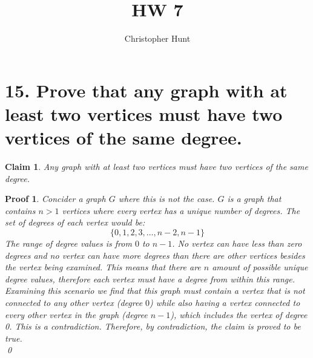 \documentclass{article}
\title{HW 7}
\author{Christopher Hunt}
\date{}
\newtheorem*{claim}{Claim}
\newtheorem*{poof}{Proof}
\begin{document}
\pagestyle{fancy}
\fancyhf{}
\rhead{\thepage}
\maketitle

\section*{15. Prove that any graph with at least two vertices must have two vertices of the same degree.}
\begin{claim}
    Any graph with at least two vertices must have two vertices of the same degree.
\end{claim}
\begin{poof}
    Concider a graph $G$ where this is not the case. $G$ is a graph that contains $n > 1$ vertices where every vertex has a unique number of degrees. The set of degrees of each vertex would be:
    \[\{0,1,2,3,\ldots,n-2,n-1\}\]
    The range of degree values is from $0$ to $n-1$. No vertex can have less than zero degrees and no vertex can have more degrees than there are other vertices besides the vertex being examined. This means that there are $n$ amount of possible unique degree values, therefore each vertex must have a degree from within this range. Examining this scenario we find that this graph must contain a vertex that is not connected to any other vertex (degree $0$) while also having a vertex connected to every other vertex in the graph (degree $n-1$), which includes the vertex of degree 0. This is a contradiction. Therefore, by contradiction, the claim is proved to be true.\\
    \qed\end{poof}

\newpage
\end{document}
